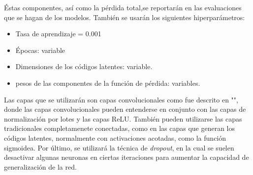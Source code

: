 \documentclass[12pt, spanish]{article}
\begin{document}
Éstas componentes, así como la pérdida total,se reportarán en las evaluaciones
que se hagan de los modelos.
También se usarán los siguientes hiperparámetros:

\begin{itemize}
    \item Tasa de aprendizaje = 0.001
    \item Épocas: variable
    \item Dimensiones de los códigos latentes: variable.
    \item pesos de las componentes de la función de pérdida: variables.
\end{itemize}

Las capas que se utilizarán son capas convolucionales como fue descrito en
"\textit{}", donde las capas convolucionales pueden
entenderse en conjunto con las capas de normalización por lotes y las capas ReLU.
También pueden utilizarse las capas tradicionales completamenete conectadas,
como en las capas que generan los códigos latentes, normalmente con activaciones
acotadas, como la función sigmoidea.
Por último, se utilizará la técnica de \textit{dropout}, en la cual se suelen
desactivar algunas neuronas en ciertas iteraciones para aumentar la capacidad de
generalización de la red.
\end{document}
